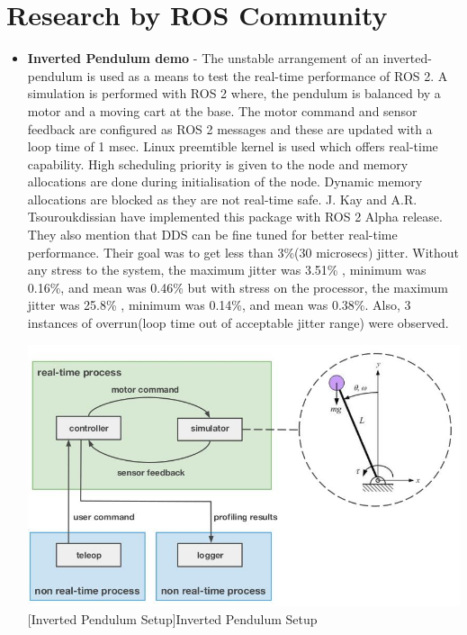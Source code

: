 \documentclass[%
xelatex,
	oneside,		%
	12pt,			%
	parskip=half,	%
	abstracton,
	chapterprefix=true%
    appendixprefix=true]
{scrbook}
\begin{document}
	\section{Research by ROS Community}
\vspace*{0.5cm}
\begin{itemize}
\item {\bfseries Inverted Pendulum demo} - The unstable arrangement of an inverted-pendulum is used as a means to test  the real-time performance of ROS 2. A simulation is performed with ROS 2 where, the pendulum is balanced by a motor and a moving cart at the base. The motor command and sensor feedback are configured as ROS 2 messages and these are updated with a loop time of 1 msec. Linux preemtible kernel is used which offers real-time capability. High scheduling priority is given to the node and memory allocations are done during initialisation of the node. Dynamic memory allocations are blocked as they are not real-time safe. J. Kay and A.R. Tsouroukdissian have implemented this package with ROS 2 Alpha release. They also mention that DDS can be fine tuned for better real-time performance. Their goal was to get less than 3\%(30 microsecs) jitter. Without any stress to the system, the maximum jitter was 3.51\% , minimum was 0.16\%, and mean was 0.46\% but with stress on the processor, the maximum jitter was 25.8\% , minimum was 0.14\%, and mean was 0.38\%. Also, 3 instances of overrun(loop time out of acceptable jitter range) were observed.
	\begin{center}
\includegraphics[scale=0.5]{fig/inverted.jpg}
[Inverted Pendulum Setup]{Inverted Pendulum Setup\cite{deadline}}
\label{fig:inverpen}
\end{center}

\end{itemize}
\end{document}
